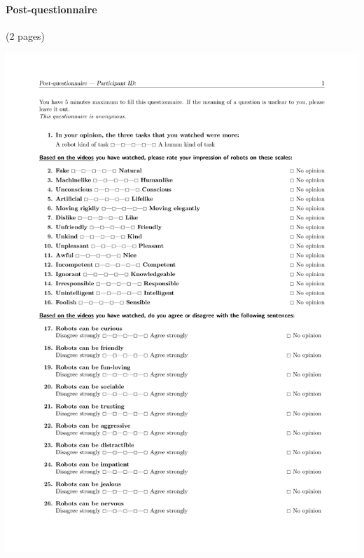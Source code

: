 \documentclass[lettersize, noapacite, twoside, HRI]{apa_HRI}
\begin{document}
\pagebreak
\paragraph{Post-questionnaire} (2 pages)

\begin{center}
    \includegraphics[width=0.9\linewidth]{post-questionnaire}


\end{center}
\end{document}
